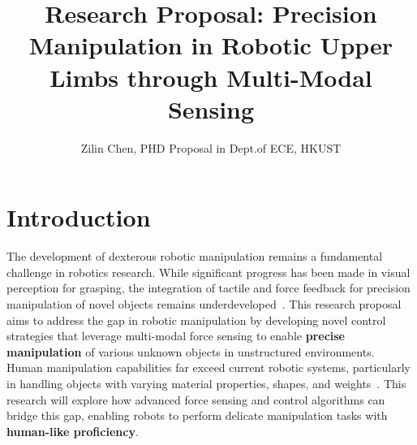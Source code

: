 \documentclass[11pt,a4paper]{article}
\title{Research Proposal: Precision Manipulation in Robotic Upper Limbs through Multi-Modal Sensing}
\author{Zilin Chen, PHD Proposal in Dept.\;of ECE, HKUST}
\date{}
\begin{document}
\maketitle

\section{Introduction}
The development of dexterous robotic manipulation remains a fundamental challenge in robotics research. While significant progress has been made in visual perception for grasping, the integration of tactile and force feedback for precision manipulation of novel objects remains underdeveloped~\cite{billard2019trends}. This research proposal aims to address the gap in robotic manipulation by developing novel control strategies that leverage multi-modal force sensing to enable \textbf{precise manipulation} of various unknown objects in unstructured environments.\\
Human manipulation capabilities far exceed current robotic systems, particularly in handling objects with varying material properties, shapes, and weights~\cite{chen2023bi}. This research will explore how advanced force sensing and control algorithms can bridge this gap, enabling robots to perform delicate manipulation tasks with \textbf{human-like proficiency}.
\end{document}
